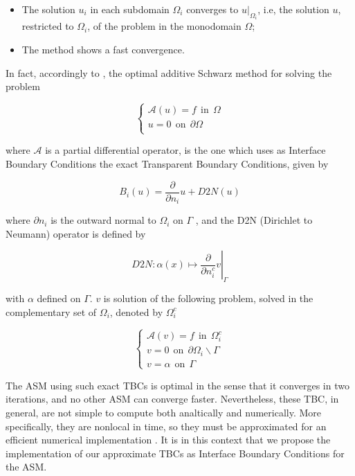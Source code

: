 \begin{itemize}
\item The solution $u_i$ in each subdomain $\Omega_i$ converges to $u|_{\Omega_i}$, i.e, the solution $u$, restricted to $\Omega_i$, of the problem in the monodomain $\Omega$;
\item The method shows a fast convergence.
\end{itemize} 

\indent In fact, accordingly to \cite{Japhet2003}, the optimal additive Schwarz method for solving the problem 

\begin{equation*}
\begin{cases}
\mathcal{A}(u) = f \ \ \text{in} \ \ \Omega\\
u = 0 \ \ \text{on} \ \ \partial\Omega\\
\end{cases}
\end{equation*}

\noindent where $\mathcal{A}$ is a partial differential operator, is the one which uses as Interface Boundary Conditions the exact Transparent Boundary Conditions, given by

$$B_i(u) = \frac{\partial}{\partial n_i}u + D2N(u)$$

\noindent where $\partial n_i$ is the outward normal to $\Omega_i$ on $\Gamma$ , and the D2N (Dirichlet to Neumann) operator is defined by

$$\left. D2N : \alpha(x) \mapsto \frac{\partial}{\partial n_i^c}v \right\rvert_\Gamma$$

\noindent with $\alpha$ defined on $\Gamma$. $v$ is solution of the following problem, solved in the complementary set of $\Omega_i$, denoted by $\Omega_i^c$

\begin{equation*}
\begin{cases}
\mathcal{A}(v) = f \ \ \text{in} \ \ \Omega_i^c\\
v = 0 \ \ \text{on} \ \ \partial \Omega_i \backslash \Gamma \\
v = \alpha \ \ \text{on} \ \ \Gamma
\end{cases}
\end{equation*}

\indent The ASM using such exact TBCs is optimal in the sense that it converges in two iterations, and no other ASM can converge faster. Nevertheless, these TBC, in general, are not simple to compute both analtically and numerically. More specifically, they are nonlocal in time, so they must be approximated for an efficient numerical implementation \cite{Xavieretal2008}. It is in this context that we propose the implementation of our approximate TBCs as Interface Boundary Conditions for the ASM.

